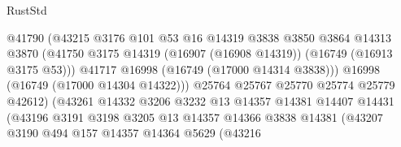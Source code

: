 \begin{lexlean}{RustStd}
\begin{coremodule}
                                        @41790
                                        (@43215
                                          @3176
                                          @101
                                          @53
                                          @16
                                          @14319
                                          @3838
                                          @3850
                                          @3864
                                          @14313
                                          @3870
                                          (@41750
                                            @3175
                                            @14319
                                            (@16907 (@16908 @14319))
                                            (@16749 (@16913 @3175 @53)))
                                          @41717
                                          @16998
                                          (@16749 (@17000 @14314 @3838)))
                                        @16998
                                        (@16749 (@17000 @14304 @14322)))
                                      @25764
                                      @25767
                                      @25770
                                      @25774
                                      @25779
                                      @42612)
                                    (@43261
                                      @14332
                                      @3206
                                      @3232
                                      @13
                                      @14357
                                      @14381
                                      @14407
                                      @14431
                                      (@43196
                                        @3191
                                        @3198
                                        @3205
                                        @13
                                        @14357
                                        @14366
                                        @3838
                                        @14381
                                        (@43207
                                          @3190
                                          @494
                                          @157
                                          @14357
                                          @14364
                                          @5629
                                          (@43216

\end{coremodule}
\end{lexlean}
